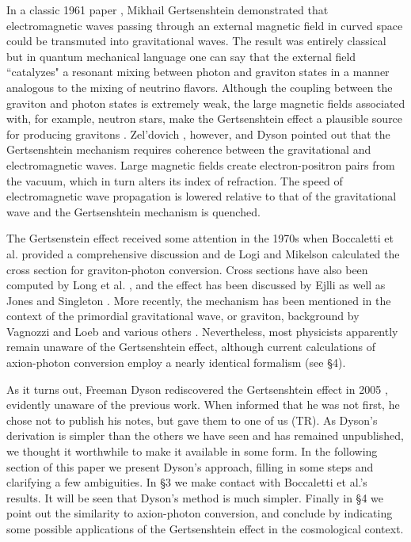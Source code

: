 \documentclass[12pt]{article}
\begin{document}
In a classic 1961 paper \cite{Gert61}, Mikhail Gertsenshtein demonstrated that electromagnetic waves passing through an external magnetic field in curved space could be transmuted into gravitational waves. The result was entirely classical but in quantum mechanical language one can say that the external field ``catalyzes" a resonant mixing between photon and graviton states in a manner analogous to the mixing of neutrino flavors. Although the coupling between the graviton and photon states is extremely weak, the large magnetic fields associated with, for example, neutron stars, make the Gertsenshtein effect a plausible source for producing gravitons \cite{RB06}.  Zel'dovich \cite{Zel73}, however, and Dyson \cite{Dyson05a,Dyson05b} pointed out that the Gertsenshtein mechanism requires coherence between the gravitational and electromagnetic waves. Large magnetic fields  create electron-positron pairs from the vacuum, which in turn alters its index of refraction. The speed of electromagnetic wave propagation is lowered relative to that of the gravitational wave and the Gertsenshtein mechanism is quenched.

The Gertsenstein effect received some attention in the 1970s when Boccaletti et al. \cite{Bocc70} provided a comprehensive discussion and de Logi and Mikelson \cite{deLogi77} calculated the cross section for graviton-photon conversion.  Cross sections have also been computed by Long et al. \cite{Long94}, and the effect has been discussed by Ejlli \cite{Ejlli13} as well as Jones and Singleton \cite{Jones18}. More recently, the mechanism has been mentioned in the context of the primordial gravitational wave, or graviton, background by Vagnozzi and Loeb \cite{Vagnozzi:2022qmc} and various others \cite{add1,add4,add5,add6,add7}. Nevertheless, most physicists apparently remain unaware of the Gertsenshtein effect, although  current calculations of axion-photon conversion employ a nearly identical formalism (see \S 4). 
 
As it turns out, Freeman Dyson rediscovered the Gertsenshtein effect in 2005 \cite{Dyson05a}, evidently  unaware of the previous work. When informed that he was not first, he chose not to publish his notes, but gave them to one of us (TR). As Dyson's derivation is simpler than the others we have seen and has remained unpublished, we thought it worthwhile to make it available in some form. In the following section of this paper we present Dyson's approach, filling in some steps and  clarifying a few ambiguities.  In \S 3 we  make contact with Boccaletti et al.'s results.  It will be seen that Dyson's method is much simpler. Finally in \S 4 we point out the similarity to axion-photon conversion, and conclude by indicating some possible applications of the Gertsenshtein effect in the cosmological context. 
\end{document}
